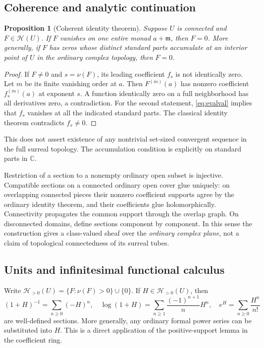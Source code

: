 \documentclass[11pt,oneside]{article}
\numberwithin{equation}{section}
\newtheorem{proposition}[theorem]{Proposition}
\theoremstyle{definition}
\theoremstyle{remark}\newtheorem{remark}[theorem]{Remark}
\newcommand{\C}{\mathbb C}
\newcommand{\HH}{\mathscr H}
\newcommand{\m}{\mathfrak m}
\begin{document}
\subsection{Coherence and analytic continuation}
\begin{proposition}[Coherent identity theorem]\label{prop:identity}
Suppose $U$ is connected and $F\in\HH(U)$.
If $F$ vanishes on one entire monad $a+\m$, then $F=0$.
More generally, if $F$ has zeros whose distinct standard parts accumulate
at an interior point of $U$ in the ordinary complex topology, then $F=0$.
\end{proposition}
\begin{proof}
If $F\ne0$ and $s=\nu(F)$, its leading coefficient $f_s$ is not
identically zero. Let $m$ be its finite vanishing order at $a$.
Then $F^{(m)}(a)$ has nonzero coefficient $f_s^{(m)}(a)$ at exponent $s$.
A function identically zero on a full neighborhood has all derivatives
zero, a contradiction. For the second statement, \eqref{eq:evalval}
implies that $f_s$ vanishes at all the indicated standard parts. The
classical identity theorem contradicts $f_s\ne0$.
\end{proof}
This does not assert existence of any nontrivial set-sized convergent
sequence in the full surreal topology. The accumulation condition is
explicitly on standard parts in $\C$.

Restriction of a section to a nonempty ordinary open subset is injective.
Compatible sections on a connected ordinary open cover glue uniquely:
on overlapping connected pieces their nonzero coefficient supports agree
by the ordinary identity theorem, and their coefficients glue holomorphically.
Connectivity propagates the common support through the overlap graph.
On disconnected domains, define sections component by component.
In this sense the construction gives a class-valued sheaf over the
\emph{ordinary complex plane}, not a claim of topological connectedness
of its surreal tubes.

\subsection{Units and infinitesimal functional calculus}
Write $\HH_{>0}(U)=\{F:\nu(F)>0\}\cup\{0\}$.
If $H\in\HH_{>0}(U)$, then
\begin{equation}\label{eq:smallcalc}
 (1+H)^{-1}=\sum_{n\geq0}(-H)^n,\quad
 \log(1+H)=\sum_{n\geq1}\frac{(-1)^{n+1}}nH^n,\quad
 e^H=\sum_{n\geq0}\frac{H^n}{n!}
\end{equation}
are well-defined sections. More generally, any ordinary formal power
series can be substituted into $H$. This is a direct application of the
positive-support lemma in the coefficient ring.
\end{document}
